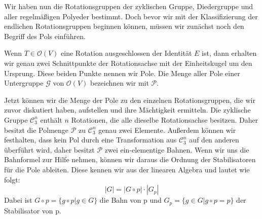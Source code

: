 Wir haben nun die Rotationsgruppen der zyklischen Gruppe, Diedergruppe und aller regelmäßigen Polyeder bestimmt. Doch bevor wir mit der Klassifizierung der endlichen Rotationsgruppen beginnen können, müssen wir zunächst noch den Begriff des Pols einführen.

\begin{defi}[Pole]
	Wenn $T \in \mathcal{O}(V)$ eine Rotation ausgeschlossen der Identität $E$ ist, dann erhalten wir genau zwei Schnittpunkte der Rotationsachse mit der Einheitskugel um den Ursprung. Diese beiden Punkte nennen wir Pole. Die Menge aller Pole einer Untergruppe $\mathcal{G}$ von $\mathcal{O}(V)$ bezeichnen wir mit $\mathcal{P}$.
\end{defi} 

Jetzt können wir die Menge der Pole zu den einzelnen Rotationsgruppen, die wir zuvor diskutiert haben, aufstellen und ihre Mächtigkeit ermitteln. Die zyklische Gruppe $\mathcal{C}^n_3$ enthält $n$ Rotationen, die alle dieselbe Rotationsachse besitzen. Daher besitzt die Polmenge $\mathcal{P}$ zu $\mathcal{C}^n_3$ genau zwei Elemente. Außerdem können wir festhalten, dass kein Pol durch eine Transformation aus $\mathcal{C}^n_3$ auf den anderen überführt wird, daher besitzt $\mathcal{P}$ zwei ein-elementige Bahnen. Wenn wir uns die Bahnformel zur Hilfe nehmen, können wir daraus die Ordnung der Stabilisatoren für die Pole ableiten. Diese kennen wir aus der linearen Algebra und lautet wie folgt:
$$ |G| = |G \circ p| \cdot |G_p| $$
Dabei ist $G \circ p = \{g \circ p | g \in G\}$ die Bahn von p und $G_p = \{g \in G | g \circ p = p \}$ der Stabilisator von p. 

